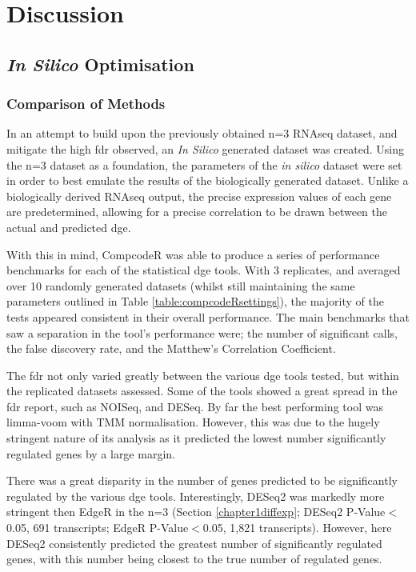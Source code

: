 \section{Discussion}

\subsection{\textit{In Silico} Optimisation}
\subsubsection{Comparison of Methods}

In an attempt to build upon the previously obtained n=3 RNAseq dataset, and mitigate the high \acrshort{fdr} observed, an \textit{In Silico} generated dataset was created. Using the n=3 dataset as a foundation, the parameters of the \textit{in silico} dataset were set in order to best emulate the results of the biologically generated dataset. Unlike a biologically derived RNAseq output, the precise expression values of each gene are predetermined, allowing for a precise correlation to be drawn between the actual and predicted \acrshort{dge}. 

With this in mind, CompcodeR was able to produce a series of performance benchmarks for each of the statistical \acrshort{dge} tools. With 3 replicates, and averaged over 10 randomly generated datasets (whilst still maintaining the same parameters outlined in Table \ref{table:compcodeRsettings}), the majority of the tests appeared consistent in their overall performance. The main benchmarks that saw a separation in the tool's performance were; the number of significant calls, the false discovery rate, and the Matthew's Correlation Coefficient.  

The \acrshort{fdr} not only varied greatly between the various \acrshort{dge} tools tested, but within the replicated datasets assessed. Some of the tools showed a great spread in the \acrshort{fdr} report, such as NOISeq, and DESeq. By far the best performing tool was limma-voom with TMM normalisation. However, this was due to the hugely stringent nature of its analysis as it predicted the lowest number significantly regulated genes by a large margin. 

There was a great disparity in the number of genes predicted to be significantly regulated by the various \acrshort{dge} tools. Interestingly, DESeq2 was markedly more stringent then EdgeR in the n=3 (Section \ref{chapter1diffexp}; DESeq2 P-Value$<$0.05, 691 transcripts; EdgeR P-Value$<$0.05, 1,821 transcripts). However, here DESeq2 consistently predicted the greatest number of significantly regulated genes, with this number being closest to the true number of regulated genes.

